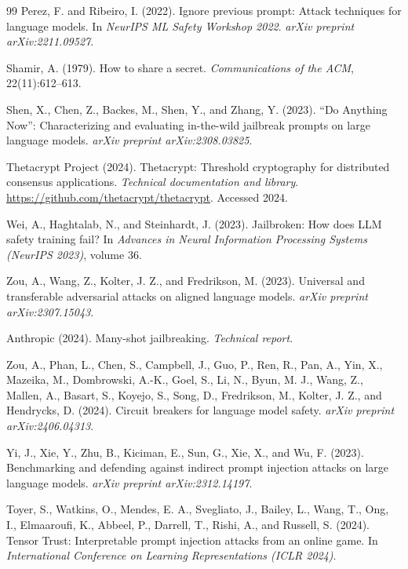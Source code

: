\documentclass[sigconf,natbib=false]{acmart}
\begin{document}
\begin{thebibliography}{99}
Perez, F. and Ribeiro, I. (2022).
Ignore previous prompt: Attack techniques for language models.
In \textit{NeurIPS ML Safety Workshop 2022}.
\textit{arXiv preprint arXiv:2211.09527}.

Shamir, A. (1979).
How to share a secret.
\textit{Communications of the ACM}, 22(11):612--613.

Shen, X., Chen, Z., Backes, M., Shen, Y., and Zhang, Y. (2023).
``Do Anything Now'': Characterizing and evaluating in-the-wild
jailbreak prompts on large language models.
\textit{arXiv preprint arXiv:2308.03825}.

Thetacrypt Project (2024).
Thetacrypt: Threshold cryptography for distributed consensus applications.
\textit{Technical documentation and library}.
\url{https://github.com/thetacrypt/thetacrypt}.
Accessed 2024.

Wei, A., Haghtalab, N., and Steinhardt, J. (2023).
Jailbroken: How does LLM safety training fail?
In \textit{Advances in Neural Information Processing Systems (NeurIPS 2023)},
volume 36.

Zou, A., Wang, Z., Kolter, J. Z., and Fredrikson, M. (2023).
Universal and transferable adversarial attacks on aligned language models.
\textit{arXiv preprint arXiv:2307.15043}.

Anthropic (2024).
Many-shot jailbreaking.
\textit{Technical report}.

Zou, A., Phan, L., Chen, S., Campbell, J., Guo, P., Ren, R., Pan, A.,
Yin, X., Mazeika, M., Dombrowski, A.-K., Goel, S., Li, N., Byun, M. J.,
Wang, Z., Mallen, A., Basart, S., Koyejo, S., Song, D., Fredrikson, M.,
Kolter, J. Z., and Hendrycks, D. (2024).
Circuit breakers for language model safety.
\textit{arXiv preprint arXiv:2406.04313}.

Yi, J., Xie, Y., Zhu, B., Kiciman, E., Sun, G., Xie, X., and Wu, F. (2023).
Benchmarking and defending against indirect prompt injection attacks on large
language models.
\textit{arXiv preprint arXiv:2312.14197}.

Toyer, S., Watkins, O., Mendes, E. A., Svegliato, J., Bailey, L.,
Wang, T., Ong, I., Elmaaroufi, K., Abbeel, P., Darrell, T., Rishi, A.,
and Russell, S. (2024).
Tensor Trust: Interpretable prompt injection attacks from an online game.
In \textit{International Conference on Learning Representations (ICLR 2024)}.

\end{thebibliography}
\end{document}

